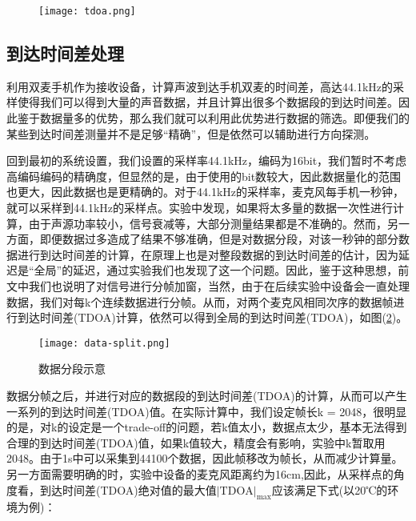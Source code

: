 \documentclass[winfonts,oneside]{njuthesis}
\begin{document}
			\begin{figure}[H]
				\centering
				\texttt{[image: tdoa.png]} 
				\caption{{}}
				\label{fig: tdoa}
			\end{figure}
		
		\subsection{到达时间差处理}
		
		利用双麦手机作为接收设备，计算声波到达手机双麦的时间差，高达44.1kHz的采样使得我们可以得到大量的声音数据，并且计算出很多个数据段的到达时间差。因此鉴于数据量多的优势，那么我们就可以利用此优势进行数据的筛选。即便我们的某些到达时间差测量并不是足够“精确”，但是依然可以辅助进行方向探测。
		
		回到最初的系统设置，我们设置的采样率44.1kHz，编码为16bit，我们暂时不考虑高编码编码的精确度，但显然的是，由于使用的bit数较大，因此数据量化的范围也更大，因此数据也是更精确的。对于44.1kHz的采样率，麦克风每手机一秒钟，就可以采样到44.1kHz的采样点。实验中发现，如果将太多量的数据一次性进行计算，由于声源功率较小，信号衰减等，大部分测量结果都是不准确的。然而，另一方面，即便数据过多造成了结果不够准确，但是对数据分段，对该一秒钟的部分数据进行到达时间差的计算，在原理上也是对整段数据的到达时间差的估计，因为延迟是“全局”的延迟，通过实验我们也发现了这一个问题。因此，鉴于这种思想，前文中我们也说明了对信号进行分帧加窗，当然，由于在后续实验中设备会一直处理数据，我们对每k个连续数据进行分帧。从而，对两个麦克风相同次序的数据帧进行到达时间差(TDOA)计算，依然可以得到全局的到达时间差(TDOA)，如图(\ref{fig: data-split})。
		
		\begin{figure}[H]
			\centering
			\texttt{[image: data-split.png]} 
			\caption{{数据分段示意}}
			\label{fig: data-split}
		\end{figure}
		
		数据分帧之后，并进行对应的数据段的到达时间差(TDOA)的计算，从而可以产生一系列的到达时间差(TDOA)值。在实际计算中，我们设定帧长k = 2048，很明显的是，对k的设定是一个trade-off的问题，若k值太小，数据点太少，基本无法得到合理的到达时间差(TDOA)值，如果k值较大，精度会有影响，实验中k暂取用2048。由于1s中可以采集到44100个数据，因此帧移改为帧长，从而减少计算量。另一方面需要明确的时，实验中设备的麦克风距离约为16cm,因此，从采样点的角度看，到达时间差(TDOA)绝对值的最大值$|\text{TDOA}|_{\text{max}}$应该满足下式(以20℃的环境为例)：
		
\end{document}
